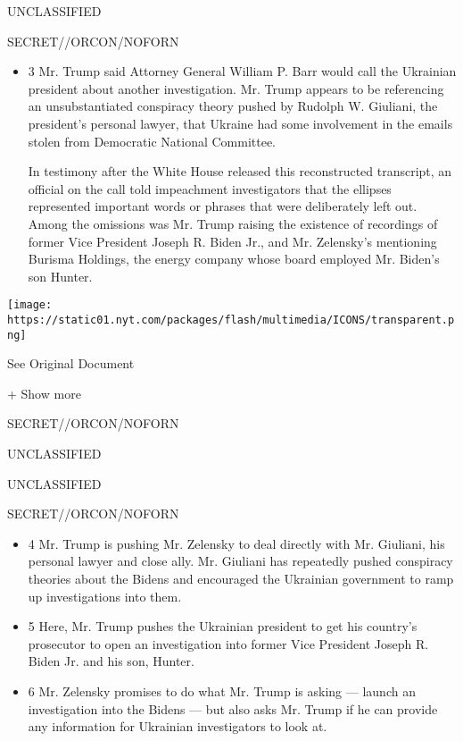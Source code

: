 UNCLASSIFIED

SECRET//ORCON/NOFORN

\begin{itemize}
\item
  3 Mr. Trump said Attorney General William P. Barr would call the
  Ukrainian president about another investigation. Mr. Trump appears to
  be referencing an unsubstantiated conspiracy theory pushed by Rudolph
  W. Giuliani, the president's personal lawyer, that Ukraine had some
  involvement in the emails stolen from Democratic National Committee.

  In testimony after the White House released this reconstructed
  transcript, an official on the call told impeachment investigators
  that the ellipses represented important words or phrases that were
  deliberately left out. Among the omissions was Mr. Trump raising the
  existence of recordings of former Vice President Joseph R. Biden Jr.,
  and Mr. Zelensky's mentioning Burisma Holdings, the energy company
  whose board employed Mr. Biden's son Hunter.
\end{itemize}

\protect\hyperlink{}{}

\texttt{[image: https://static01.nyt.com/packages/flash/multimedia/ICONS/transparent.png]}

See Original Document

+ Show more

SECRET//ORCON/NOFORN

UNCLASSIFIED

UNCLASSIFIED

SECRET//ORCON/NOFORN

\begin{itemize}
\tightlist
\item
  4 Mr. Trump is pushing Mr. Zelensky to deal directly with Mr.
  Giuliani, his personal lawyer and close ally. Mr. Giuliani has
  repeatedly pushed conspiracy theories about the Bidens and encouraged
  the Ukrainian government to ramp up investigations into them.
\item
  5 Here, Mr. Trump pushes the Ukrainian president to get his country's
  prosecutor to open an investigation into former Vice President Joseph
  R. Biden Jr. and his son, Hunter.
\item
  6 Mr. Zelensky promises to do what Mr. Trump is asking --- launch an
  investigation into the Bidens --- but also asks Mr. Trump if he can
  provide any information for Ukrainian investigators to look at.
\end{itemize}

